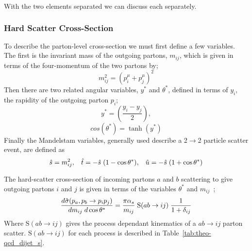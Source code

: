 With the two elements separated we can discuss each separately.

\subsubsection{Hard Scatter Cross-Section}

To describe the parton-level cross-section we must first define a few variables.
The first is the invariant mass of the outgoing partons, $m_{ij}$, which is given in terms of the four-momentum of the two partons by;
\begin{equation}
  m_{ij}^2 = (p^\mu_i + p^\mu_j)^2  
\end{equation}
\noindent
Then there are two related angular variables, $y^*$ and $\theta^*$,
defined in terms of $y_i$, the rapidity of the outgoing parton $p_i$;
\begin{equation}
  y^* = (\frac{y_i - y_j}{2}),
\end{equation}
\begin{equation}
  cos(\theta^*) = \tanh(y^*)
\end{equation}
\noindent
Finally the Mandelstam variables, generally used describe a 2$\to$2 particle scatter event, are defined as 
\begin{equation}
  \hat{s} = m_{ij}^2, \hspace{3mm}  \hat{t} = -\hat{s}\hspace{1mm}(1 - \cos{\theta^*}), \hspace{3mm} \hat{u} = - \hat{s}\hspace{1mm}(1+\cos{\theta^*})
\end{equation}

\noindent
The hard-scatter cross-section of incoming partons $a$ and $b$ scattering to give
outgoing partons $i$ and $j$ is given in terms of the variables $\theta^*$ and $m_{ij}$~\cite{theo-dijet_harris};
\begin{equation}
  \frac{d\hat{\sigma}(p_a, p_b \to p_i p_j)}{dm_{ij}\hspace{1mm}d\cos{\theta^*}} = \frac{ \pi \alpha_s}{m_{ij}}\hspace{1mm} \text{S}(ab \to ij) \hspace{1mm} \frac{1}{1+\delta_{ij}}
  \label{eq:theo-qcd_dijet_xs}
\end{equation}
Where $\text{S}(ab \to ij)$ gives the process dependant kinematics of a $ab \to ij$  parton scatter.
$\text{S}(ab \to ij)$ for each process is described in Table~\ref{tab:theo-qcd_dijet_s}.

